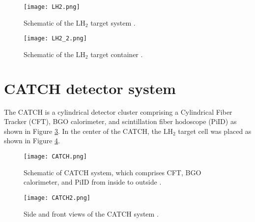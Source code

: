 \begin{figure}[!h]
 \begin{center}
   \texttt{[image: LH2.png]}
   \caption{Schematic of the LH$_{2}$ target system \cite{Nana-D}.}
   \label{fig-LH2}
 \end{center}
\end{figure}

\begin{figure}[!h]
 \begin{center}
   \texttt{[image: LH2\_2.png]}
   \caption{Schematic of the LH$_{2}$ target container \cite{Nana-D}.}
   \label{fig-LH2_2}
 \end{center}
\end{figure}

\clearpage
\section{CATCH detector system}
The CATCH is a cylindrical detector cluster comprising a Cylindrical Fiber Tracker (CFT), BGO calorimeter, and scintillation fiber hodoscope (PiID) as shown in Figure \ref{fig-CATCH}. In the center of the CATCH, the LH$_2$ target cell was placed as shown in Figure \ref{fig-CATCH2}. 

\begin{figure}[!h]
 \begin{center}
   \texttt{[image: CATCH.png]}
   \caption{Schematic of CATCH system, which comprises CFT, BGO calorimeter, and PiID from inside to outside \cite{Aka-2020}.}
   \label{fig-CATCH}
 \end{center}
\end{figure}

\begin{figure}[!h]
 \begin{center}
   \texttt{[image: CATCH2.png]}
   \caption{Side and front views of the CATCH system \cite{Aka-2020}.}
   \label{fig-CATCH2}
 \end{center}
\end{figure}

%
